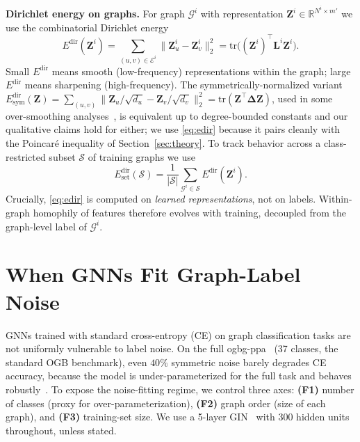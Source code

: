 \documentclass{article}
\theoremstyle{definition}
\newcommand{\Edir}{E^{\text{dir}}}
\newcommand{\Edirset}{E^{\text{dir}}_{\text{set}}}
\begin{document}
\textbf{Dirichlet energy on graphs.} For graph $\mathcal{G}^i$ with representation $\mathbf{Z}^i\in\mathbb{R}^{N^i\times m'}$ we use the combinatorial Dirichlet energy
\begin{equation}
\Edir(\mathbf{Z}^i)=\sum_{(u,v)\in\mathcal{E}^i}\bigl\|\mathbf{Z}^i_u-\mathbf{Z}^i_v\bigr\|_2^2 = \mathrm{tr}\bigl((\mathbf{Z}^i)^\top\mathbf{L}^i\mathbf{Z}^i\bigr).
\label{eq:edir}
\end{equation}
Small $\Edir$ means smooth (low-frequency) representations within the graph; large $\Edir$ means sharpening (high-frequency). The symmetrically-normalized variant $\Edir_{\mathrm{sym}}(\mathbf{Z})=\sum_{(u,v)}\|\mathbf{Z}_u/\sqrt{d_u}-\mathbf{Z}_v/\sqrt{d_v}\|_2^2 = \mathrm{tr}(\mathbf{Z}^\top\mathbf{\Delta}\mathbf{Z})$, used in some over-smoothing analyses~\citep{nt2019revisiting,oversmoothing2}, is equivalent up to degree-bounded constants and our qualitative claims hold for either; we use \eqref{eq:edir} because it pairs cleanly with the Poincar\'e inequality of Section~\ref{sec:theory}. To track behavior across a class-restricted subset $\mathcal{S}$ of training graphs we use
\begin{equation}
\Edirset(\mathcal{S})=\frac{1}{|\mathcal{S}|}\sum_{\mathcal{G}^i\in\mathcal{S}}\Edir(\mathbf{Z}^i).
\label{eq:edirset}
\end{equation}
Crucially, \eqref{eq:edir} is computed on \emph{learned representations}, not on labels. Within-graph homophily of features therefore evolves with training, decoupled from the graph-level label of $\mathcal{G}^i$.

\section{When GNNs Fit Graph-Label Noise}
\label{sec:failure_modes}

GNNs trained with standard cross-entropy (CE) on graph classification tasks are not uniformly vulnerable to label noise. On the full ogbg-ppa~\citep{PPA} (37 classes, the standard OGB benchmark), even $40\%$ symmetric noise barely degrades CE accuracy, because the model is under-parameterized for the full task and behaves robustly~\citep{memorizenoise}. To expose the noise-fitting regime, we control three axes: \textbf{(F1)} number of classes (proxy for over-parameterization), \textbf{(F2)} graph order (size of each graph), and \textbf{(F3)} training-set size. We use a 5-layer GIN~\citep{WL1} with $300$ hidden units throughout, unless stated.
\end{document}
